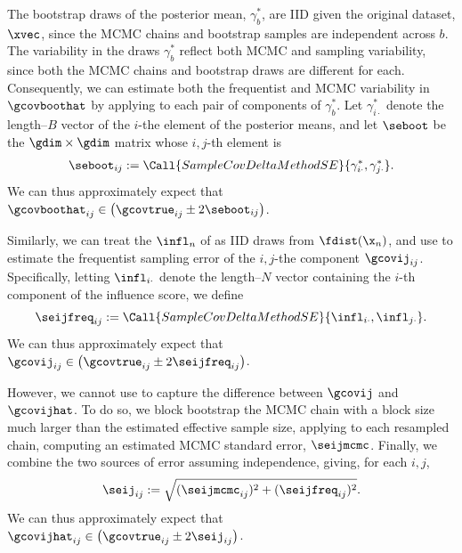 
The bootstrap draws of the posterior mean, $\gamma^*_b$, are IID given the
original dataset, $\xvec$, since the MCMC chains and bootstrap samples are
independent across $b$. The variability in the draws $\gamma^*_b$ reflect both
MCMC and sampling variability, since both the MCMC chains and bootstrap draws
are different for each.  Consequently, we can estimate both the frequentist and
MCMC variability in $\gcovboothat$ by applying  to each
pair of components of $\gamma^*_b$.  Let $\gamma^*_{i\cdot}$ denote the
length--$B$ vector of the $i$-the element of the posterior means, and let
$\seboot$ be the $\gdim\times\gdim$ matrix whose $i,j$-th element is
%
\begin{align*}
%
\seboot_{ij} :=
    \Call{SampleCovDeltaMethodSE}{\gamma^*_{i\cdot}, \gamma^*_{j\cdot}}.
%
\end{align*}
%
We can thus approximately expect that
$\gcovboothat_{ij} \in \left(\gcovtrue_{ij} \pm 2 \seboot_{ij} \right)$.

Similarly, we can treat the $\infl_n$ of  as IID draws from
$\fdist(\x_n)$, and use  to estimate the frequentist
sampling error of the $i,j$-the component $\gcovij_{ij}$.  Specifically,
letting $\infl_{i\cdot}$ denote the length--$N$ vector containing the $i$-th
component of the influence score, we define
%
\begin{align*}
%
\seijfreq_{ij} :=
    \Call{SampleCovDeltaMethodSE}{\infl_{i\cdot}, \infl_{j\cdot}}.
%
\end{align*}
%
We can thus approximately expect that
$\gcovij_{ij} \in \left(\gcovtrue_{ij} \pm 2 \seijfreq_{ij} \right)$.

However, we cannot use  to capture the difference
between $\gcovij$ and $\gcovijhat$.  To do so, we block bootstrap the MCMC chain
with a block size much larger than the estimated effective sample size,
applying  to each resampled chain, computing an estimated
MCMC standard error, $\seijmcmc$.  Finally, we combine the two sources of
error assuming independence, giving, for each $i,j$,
%
\begin{align*}
%
\seij_{ij} := \sqrt{(\seijmcmc_{ij})^2 + (\seijfreq_{ij})^2}.
%
\end{align*}
%
We can thus approximately expect that
$\gcovijhat_{ij} \in \left(\gcovtrue_{ij} \pm 2 \seij_{ij} \right)$.
